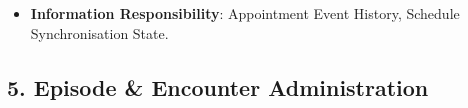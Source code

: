 \begin{itemize}
\begin{itemize}
\begin{itemize}

\item
\emph{Function}: \texttt{} — Projects synchronised appointment timelines to clinical dashboards and care coordinators.



\item
\emph{Exposed Service}: \texttt{} — Exposes consolidated patient appointment schedules across facilities.



\end{itemize}


\end{itemize}


\item
\textbf{Information Responsibility}: Appointment Event History, Schedule Synchronisation State.



\end{itemize}
\label{rad:sa:60}

\par\smallskip
{}\label{rad:sa:62}
\subsection*{5. Episode \& Encounter Administration}
\label{rad:sa:63}

